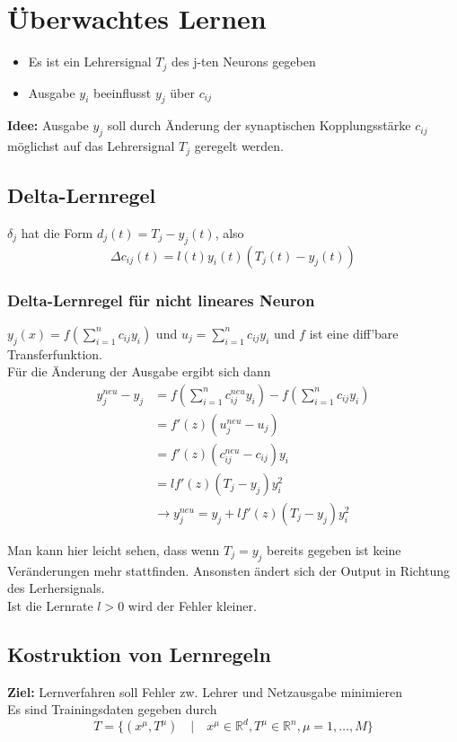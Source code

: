 \section{Überwachtes Lernen}
\begin{itemize}
    \item Es ist ein Lehrersignal $T_j$ des j-ten Neurons gegeben
    \item Ausgabe $y_i$ beeinflusst $y_j$ über $c_{ij}$
\end{itemize}
\textbf{Idee:} Ausgabe $y_j$ soll durch Änderung der synaptischen Kopplungsstärke $c_{ij}$ möglichst auf das Lehrersignal $T_j$ geregelt werden.

\subsection{Delta-Lernregel}
$\delta_j$ hat die Form $d_j(t) = T_j - y_j(t)$, also
\begin{equation*}
    \Delta c_{ij}(t) = l(t)y_i(t)(T_j(t)-y_j(t))
\end{equation*}

\subsubsection{Delta-Lernregel für nicht lineares Neuron}
$y_j(x) = f(\sum_{i=1}^nc_{ij}y_i)$ und $u_j = \sum_{i=1}^nc_{ij}y_i$ und $f$ ist eine diff'bare Transferfunktion.\\
Für die Änderung der Ausgabe ergibt sich dann
\begin{align*}
    y_j^{neu} -y_j & =  f(\sum_{i=1}^nc_{ij}^{neu}y_i) - f(\sum_{i=1}^nc_{ij}y_i)\\
    &= f'(z)(u_j^{neu}-u_j)\\
    &= f'(z)(c_{ij}^{neu}-c_{ij})y_i\\
    &= lf'(z)(T_j-y_j)y_i^2\\
    &\rightarrow y_j^{neu} = y_j +  lf'(z)(T_j-y_j)y_i^2
\end{align*}

Man kann hier leicht sehen, dass wenn $T_j = y_j$ bereits gegeben ist keine Veränderungen mehr stattfinden. Ansonsten ändert sich der Output in Richtung des Lerhersignals.\\
Ist die Lernrate $l>0$ wird der Fehler kleiner.

\subsection{Kostruktion von Lernregeln}
\textbf{Ziel:} Lernverfahren soll Fehler zw. Lehrer und Netzausgabe minimieren\\
Es sind Trainingsdaten gegeben durch
\begin{equation*}
    T = \{(x^\mu,T^\mu) \quad|\quad x^\mu \in \mathbb{R}^d, T^\mu \in \mathbb{R}^n, \mu=1,\dots,M\}
\end{equation*}

